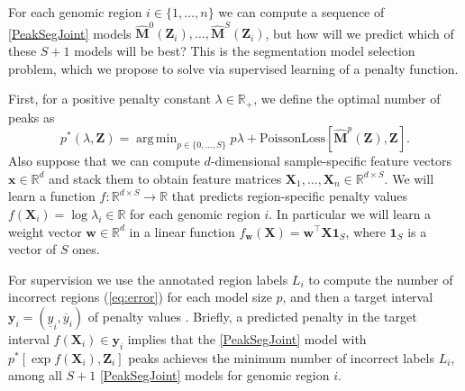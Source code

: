 \documentclass{article} %
\DeclareMathOperator*{\argmin}{arg\,min}
\newcommand{\RR}{\mathbb R}
\begin{document}
For each genomic region $i\in\{1,\dots,n\}$ we can compute a sequence
of \ref{PeakSegJoint} models $\mathbf{\hat M}^0(\mathbf Z_i),\dots,
\mathbf{\hat M}^S(\mathbf Z_i)$, but how will we predict which of
these $S+1$ models will be best?
This is the segmentation model selection problem, which we propose to
solve via supervised learning of a penalty function.

First, for a positive penalty constant $\lambda\in\RR_+$, we define
the optimal number of peaks as
\begin{equation}
  \label{eq:optimal_segments}
  p^*(\lambda, \mathbf Z) =
  \argmin_{p\in\{0, \dots, S\}}
  p \lambda + 
  \text{PoissonLoss}\left[
    \mathbf{\hat M}^p(\mathbf Z),
    \mathbf Z
  \right].
\end{equation}
Also suppose that we can compute $d$-dimensional sample-specific
feature vectors $\mathbf x\in\RR^d$ and stack them to obtain feature
matrices $\mathbf X_1,\dots, \mathbf X_n\in\RR^{d\times S}$. We will
learn a function $f:\RR^{d\times S}\rightarrow\RR$ that predicts
region-specific penalty values $f(\mathbf X_i) = \log \lambda_i\in\RR$
for each genomic region $i$. In particular we will learn a weight
vector $\mathbf w\in\RR^d$ in a linear function $f_{\mathbf w}(\mathbf X) =
\mathbf w^\intercal \mathbf X \mathbf 1_S$, where $\mathbf 1_S$ is a
vector of $S$ ones.

For supervision we use the annotated region labels $L_i$ to compute
the number of incorrect regions (\ref{eq:error}) for each model size
$p$, and then a target interval $\mathbf y_i = ( \underline y_i,
\overline y_i )$ of penalty values \citep{HOCKING-penalties}.
Briefly, a predicted penalty in the target interval $f(\mathbf
X_i)\in\mathbf y_i$ implies that the \ref{PeakSegJoint} model with
$p^*\left[\exp f(\mathbf X_i), \mathbf Z_i\right]$ peaks achieves the
minimum number of incorrect labels $L_i$, among all $S+1$
\ref{PeakSegJoint} models for genomic region $i$.
\end{document}
